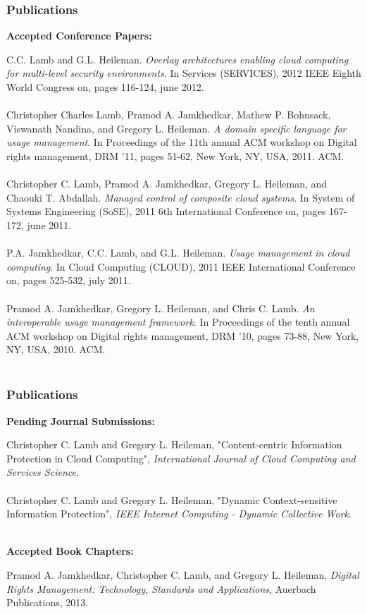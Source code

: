 \documentclass[t,handout]{beamer}
\begin{document}
\begin{frame}
\frametitle{Publications}
{\bf Accepted Conference Papers:} \\
\begin{scriptsize}
C.C. Lamb and G.L. Heileman. {\sl Overlay architectures enabling cloud computing for multi-level security environments}. In Services (SERVICES), 2012 IEEE Eighth World Congress on, pages 116-124, june 2012.\\
~\\
Christopher Charles Lamb, Pramod A. Jamkhedkar, Mathew P. Bohnsack, Viswanath Nandina, and Gregory L. Heileman. {\sl A domain specific language for usage management}. In Proceedings of the 11th annual ACM workshop on Digital rights management, DRM '11, pages 51-62, New York, NY, USA, 2011. ACM. \\
~\\
Christopher C. Lamb, Pramod A. Jamkhedkar, Gregory L. Heileman, and Chaouki T. Abdallah. {\sl Managed control of composite cloud systems}. In System of Systems Engineering (SoSE), 2011 6th International Conference on, pages 167-172, june 2011. \\
~\\
P.A. Jamkhedkar, C.C. Lamb, and G.L. Heileman. {\sl Usage management in cloud computing}. In Cloud Computing (CLOUD), 2011 IEEE International Conference on, pages 525-532, july 2011. \\
~\\
Pramod A. Jamkhedkar, Gregory L. Heileman, and Chris C. Lamb. {\sl An interoperable usage management framework}. In Proceedings of the tenth annual ACM workshop on Digital rights management, DRM '10, pages 73-88, New York, NY, USA, 2010. ACM. \\
~\\
\end{scriptsize}
\end{frame}

\begin{frame}
\frametitle{Publications}
{\bf Pending Journal Submissions:} \\
\begin{scriptsize}
Christopher C. Lamb and Gregory L. Heileman, "Content-centric Information Protection in Cloud Computing", {\it International Journal of Cloud Computing and Services Science}. \\
~\\
Christopher C. Lamb and Gregory L. Heileman, "Dynamic Context-sensitive Information Protection", {\it IEEE Internet Computing - Dynamic Collective Work}. \\
~\\
\end{scriptsize}
{\bf Accepted Book Chapters:} \\
\begin{scriptsize}
Pramod A. Jamkhedkar, Christopher C. Lamb, and Gregory L. Heileman, {\it Digital Rights Management: Technology, Standards and Applications}, Auerbach Publications, 2013. \\
\end{scriptsize}
\end{frame}
\end{document}
